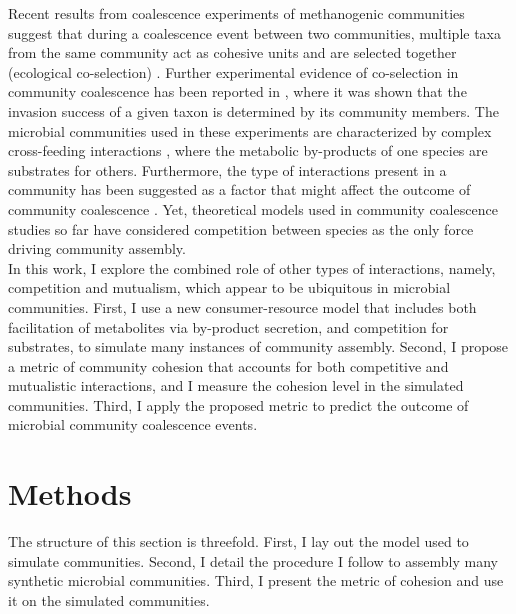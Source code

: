 \documentclass[titlepage,11pt]{article}
\begin{document}
\begin{linenumbers}
\begin{singlespace}
		Recent results from coalescence experiments of methanogenic communities suggest that during a coalescence event between two communities, multiple taxa from the same community act as cohesive units and are selected together (ecological co-selection) \citep{Sierocinski2017}. Further experimental evidence of co-selection in community coalescence has been reported in \citet{Lu2018}, where it was shown that the invasion success of a given taxon is determined by its community members. The microbial communities used in these experiments are characterized by complex cross-feeding interactions \citep{Hansen2007, Lawrence2012, Embree2015}, where the metabolic by-products of one species are substrates for others. Furthermore, the type of interactions present in a community has been suggested as a factor that might affect the outcome of community coalescence \citep{Castledine2020}.  Yet, theoretical models used in community coalescence studies so far have considered competition between species as the only force driving community assembly.\\
		In this work, I explore the combined role of other types of interactions, namely, competition and mutualism, which appear to be ubiquitous in microbial communities. First, I use a new consumer-resource model that includes both facilitation of metabolites via by-product secretion, and competition for substrates, to simulate many instances of community assembly. Second, I propose a metric of community cohesion that accounts for both competitive and mutualistic interactions, and I measure the cohesion level in the simulated communities. Third, I apply the proposed metric to predict the outcome of microbial community coalescence events.
		\section{Methods}
			The structure of this section is threefold. First, I lay out the model used to simulate communities. Second, I detail the procedure I follow to assembly many synthetic microbial communities. Third, I present the metric of cohesion and use it on the simulated communities.

\end{singlespace}
\end{linenumbers}
\end{document}
